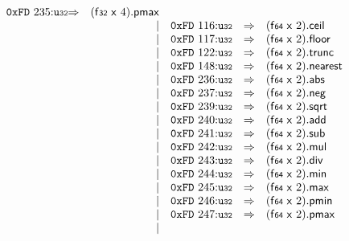 $$\begin{array}{@{}l@{}rrlll@{}l@{}}
\mathtt{0xFD}~235{:}{\mathtt{u{\scriptstyle32}}} &\Rightarrow& (\mathsf{f{\scriptstyle32}}~\mathsf{x}~4) . \mathsf{pmax} \\ &&|&
\mathtt{0xFD}~116{:}{\mathtt{u{\scriptstyle32}}} &\Rightarrow& (\mathsf{f{\scriptstyle64}}~\mathsf{x}~2) . \mathsf{ceil} \\ &&|&
\mathtt{0xFD}~117{:}{\mathtt{u{\scriptstyle32}}} &\Rightarrow& (\mathsf{f{\scriptstyle64}}~\mathsf{x}~2) . \mathsf{floor} \\ &&|&
\mathtt{0xFD}~122{:}{\mathtt{u{\scriptstyle32}}} &\Rightarrow& (\mathsf{f{\scriptstyle64}}~\mathsf{x}~2) . \mathsf{trunc} \\ &&|&
\mathtt{0xFD}~148{:}{\mathtt{u{\scriptstyle32}}} &\Rightarrow& (\mathsf{f{\scriptstyle64}}~\mathsf{x}~2) . \mathsf{nearest} \\ &&|&
\mathtt{0xFD}~236{:}{\mathtt{u{\scriptstyle32}}} &\Rightarrow& (\mathsf{f{\scriptstyle64}}~\mathsf{x}~2) . \mathsf{abs} \\ &&|&
\mathtt{0xFD}~237{:}{\mathtt{u{\scriptstyle32}}} &\Rightarrow& (\mathsf{f{\scriptstyle64}}~\mathsf{x}~2) . \mathsf{neg} \\ &&|&
\mathtt{0xFD}~239{:}{\mathtt{u{\scriptstyle32}}} &\Rightarrow& (\mathsf{f{\scriptstyle64}}~\mathsf{x}~2) . \mathsf{sqrt} \\ &&|&
\mathtt{0xFD}~240{:}{\mathtt{u{\scriptstyle32}}} &\Rightarrow& (\mathsf{f{\scriptstyle64}}~\mathsf{x}~2) . \mathsf{add} \\ &&|&
\mathtt{0xFD}~241{:}{\mathtt{u{\scriptstyle32}}} &\Rightarrow& (\mathsf{f{\scriptstyle64}}~\mathsf{x}~2) . \mathsf{sub} \\ &&|&
\mathtt{0xFD}~242{:}{\mathtt{u{\scriptstyle32}}} &\Rightarrow& (\mathsf{f{\scriptstyle64}}~\mathsf{x}~2) . \mathsf{mul} \\ &&|&
\mathtt{0xFD}~243{:}{\mathtt{u{\scriptstyle32}}} &\Rightarrow& (\mathsf{f{\scriptstyle64}}~\mathsf{x}~2) . \mathsf{div} \\ &&|&
\mathtt{0xFD}~244{:}{\mathtt{u{\scriptstyle32}}} &\Rightarrow& (\mathsf{f{\scriptstyle64}}~\mathsf{x}~2) . \mathsf{min} \\ &&|&
\mathtt{0xFD}~245{:}{\mathtt{u{\scriptstyle32}}} &\Rightarrow& (\mathsf{f{\scriptstyle64}}~\mathsf{x}~2) . \mathsf{max} \\ &&|&
\mathtt{0xFD}~246{:}{\mathtt{u{\scriptstyle32}}} &\Rightarrow& (\mathsf{f{\scriptstyle64}}~\mathsf{x}~2) . \mathsf{pmin} \\ &&|&
\mathtt{0xFD}~247{:}{\mathtt{u{\scriptstyle32}}} &\Rightarrow& (\mathsf{f{\scriptstyle64}}~\mathsf{x}~2) . \mathsf{pmax} \\ &&|&

\end{array}$$
